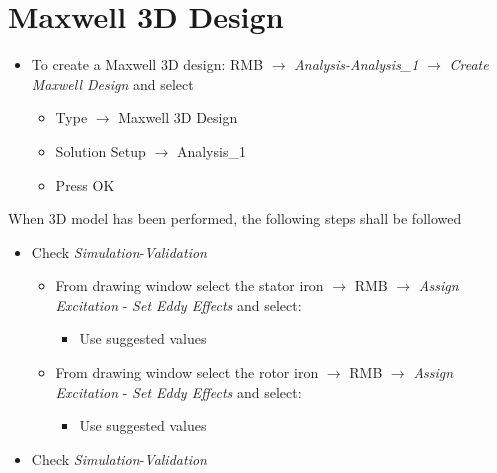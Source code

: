 \section{Maxwell 3D Design} 

\begin{itemize}
	\item[--] To create a Maxwell 3D design: RMB $\rightarrow$ \textit{Analysis-Analysis\_1} $\rightarrow$ \textit{Create Maxwell Design} and select
	\begin{itemize}
		\item[--] Type $\rightarrow$ Maxwell 3D Design
		\item[--] Solution Setup $\rightarrow$ Analysis\_1
		\item[--] Press OK
	\end{itemize}
\end{itemize}

When 3D model has been performed, the following steps shall be followed
\begin{itemize}
	\item[--] Check \textit{Simulation}-\textit{Validation}
	\begin{itemize}
		\item[--] From drawing window select the stator iron $\rightarrow$ RMB $\rightarrow$ \textit{Assign Excitation} - \textit{Set Eddy Effects} and select:
		\begin{itemize}
			\item[--] Use suggested values
		\end{itemize}
		\item[--] From drawing window select the rotor iron $\rightarrow$ RMB $\rightarrow$ \textit{Assign Excitation} - \textit{Set Eddy Effects} and select:
		\begin{itemize}
			\item[--] Use suggested values
		\end{itemize}
	\end{itemize}
\end{itemize}

\begin{itemize}
	\item[--] Check \textit{Simulation}-\textit{Validation}
\end{itemize}

